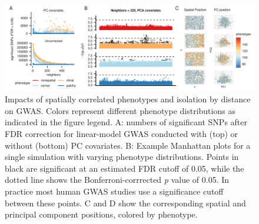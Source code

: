 \documentclass[9pt,twocolumn,twoside]{gsajnl}
\begin{document}
\begin{figure}[h!]
\centering
\includegraphics[width=\textwidth]{gwas_summary_sigma225.png}
\caption{Impacts of spatially correlated phenotypes and isolation by distance on GWAS. Colors represent different phenotype distributions as indicated in the figure legend. A: numbers of significant SNPs after FDR correction for linear-model GWAS conducted with (top) or without (bottom) PC covariates. B: Example Manhattan plots for a single simulation with varying phenotype distributions. Points in black are significant at an estimated FDR cutoff of 0.05, while the dotted line shows the Bonferroni-corrrected \textit{p} value of 0.05. In practice most human GWAS studies use a significance cutoff between these points. C and D show the corresponding spatial and principal component positions, colored by phenotype.}
\label{fig:spectrum}
\end{figure}

\newpage



\end{document}
